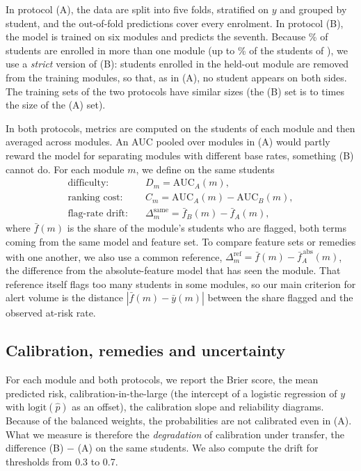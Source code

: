 \documentclass[fleqn,10pt]{JLA_article}
\newcommand{\cA}{(A)}
\newcommand{\cB}{(B)}
\newcommand{\dsame}{\Delta^{\mathrm{same}}}
\newcommand{\dref}{\Delta^{\mathrm{ref}}}
\begin{document}
In protocol \cA, the data are split into five folds, stratified on $y$ and grouped by student, and the out-of-fold predictions cover every enrolment. In protocol \cB, the model is trained on six modules and predicts the seventh. Because \resOverlapStudents\% of students are enrolled in more than one module (up to \resOverlapShareMax\% of the students of \resOverlapShareMaxMod), we use a \emph{strict} version of \cB: students enrolled in the held-out module are removed from the training modules, so that, as in \cA, no student appears on both sides. The training sets of the two protocols have similar sizes (the \cB{} set is \resSizeRatioMin{} to \resSizeRatioMax{} times the size of the \cA{} set).

In both protocols, metrics are computed on the students of each module and then averaged across modules. An AUC pooled over modules in \cA{} would partly reward the model for separating modules with different base rates, something \cB{} cannot do. For each module $m$, we define on the same students
\begin{align}
\text{difficulty:}\quad & D_m = \mathrm{AUC}_{A}(m), \\
\text{ranking cost:}\quad & C_m = \mathrm{AUC}_{A}(m) - \mathrm{AUC}_{B}(m), \\
\text{flag-rate drift:}\quad & \dsame_m = \bar{f}_{B}(m) - \bar{f}_{A}(m),
\end{align}
where $\bar{f}(m)$ is the share of the module's students who are flagged, both terms coming from the same model and feature set. To compare feature sets or remedies with one another, we also use a common reference, $\dref_m=\bar{f}(m)-\bar{f}^{\,\mathrm{abs}}_{A}(m)$, the difference from the absolute-feature model that has seen the module. That reference itself flags too many students in some modules, so our main criterion for alert volume is the distance $|\bar{f}(m)-\bar{y}(m)|$ between the share flagged and the observed at-risk rate.

\subsection{Calibration, remedies and uncertainty}
For each module and both protocols, we report the Brier score, the mean predicted risk, calibration-in-the-large (the intercept of a logistic regression of $y$ with $\mathrm{logit}(\hat{p})$ as an offset), the calibration slope and reliability diagrams. Because of the balanced weights, the probabilities are not calibrated even in \cA. What we measure is therefore the \emph{degradation} of calibration under transfer, the difference \cB{} $-$ \cA{} on the same students. We also compute the drift for thresholds from 0.3 to 0.7.
\end{document}
